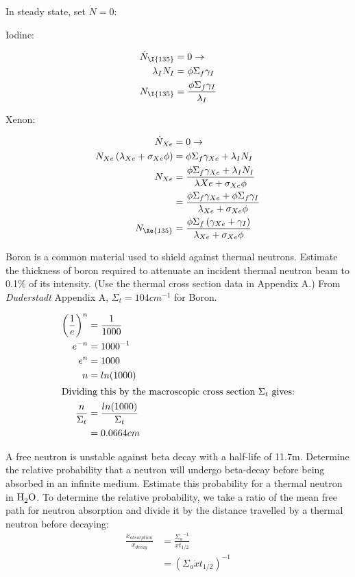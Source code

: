 \documentclass{hw}
\begin{document}
	In steady state, set $ \dot{N} = 0 $:

	Iodine:

	\begin{align*}
		\dot{N}_{\I{135}} &= 0 \rightarrow \\ 
		\lambda_I N_I &= \phi \Sigma_f \gamma_I \\
		N_{\I{135}} &= \frac{\phi \Sigma_f \gamma_I}{\lambda_I}
	\end{align*}

	Xenon:

	\begin{align*}
		\dot{N}_{Xe} &= 0 \rightarrow \\ 
		N_{Xe} \left( \lambda_{Xe} + \sigma_{Xe} \phi \right)&= \phi \Sigma_f \gamma_{Xe} + \lambda_I N_I  \\
		N_{Xe} &= \frac{\phi \Sigma_f \gamma_{Xe} + \lambda_I N_I}{\lambda{Xe} + \sigma_{Xe} \phi} \\
		&= \frac{\phi \Sigma_f \gamma_{Xe} + \phi \Sigma_f \gamma_I}{\lambda_{Xe} + \sigma_{Xe} \phi} \\
		N_{\Xe{135}} &= \frac{\phi \Sigma_f \left( \gamma_{Xe} + \gamma_I \right)}{\lambda_{Xe} + \sigma_{Xe} \phi}
	\end{align*}

	Boron is a common material used to shield against thermal neutrons. Estimate the thickness of boron required to attenuate an incident thermal neutron beam to 0.1\% of its intensity. (Use the thermal cross section data in Appendix A.)
\solution
	From \textit{Duderstadt} Appendix A, $ \Sigma_t = 104cm^{-1}$ for Boron.
	
	\begin{align*}
		\left(\frac{1}{e}\right)^n &= \frac{1}{1000} \\
		e^{-n} &= 1000^{-1} \\
		e^n &= 1000 \\
		n &= ln(1000) \\
		\intertext{Dividing this by the macroscopic cross section $ \Sigma_t $ gives:}
		\frac{n}{\Sigma_t} &= \frac{ln(1000)}{\Sigma_t} \\
		&= 0.0664 cm
	\end{align*}

	A free neutron is unstable against beta decay with a half-life of 11.7m. Determine the relative probability that a neutron will undergo beta-decay before being absorbed in an infinite medium. Estimate this probability for a thermal neutron in $ \ce{H_{2}O} $.
\solution
	To determine the relative probability, we take a ratio of the mean free path for neutron absorption and divide it by the distance travelled by a thermal neutron before decaying:
	\begin{align*}
		\frac{x_{absorption}}{x_{decay}} 
		&= \frac{{\Sigma_a}^{-1}}{\dot{x} t_{1/2}}\\
		&= \left({\Sigma_a \dot{x} t_{1/2}}\right)^{-1}
	\end{align*}
\end{document}
